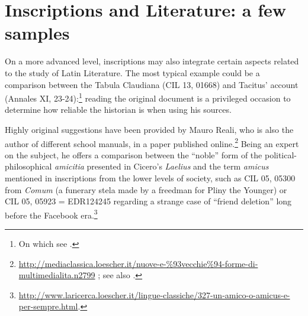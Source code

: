 \documentclass[amsthm,ebook]{saparticle}
\begin{document}
\section{Inscriptions and Literature: a few samples}
\noindent On a more advanced level, inscriptions may also integrate certain aspects related to the study of Latin Literature. The
most typical example could be a comparison between the Tabula Claudiana (CIL 13, 01668) and Tacitus’ account (Annales
XI, 23-24):\footnote{On which see \citet{Jahn1993}.} reading the original document is a privileged occasion to determine how
reliable the historian is when using his sources.

Highly original suggestions have been provided by Mauro Reali, who is also the author of different school manuals, in a
paper published online.\footnote{\url{http://mediaclassica.loescher.it/nuove-e-\%93vecchie\%94-forme-di-multimedialita.n2799}
; see also \citet{Reali2015}.} Being an expert on the subject, he offers a comparison between the ``noble'' form of
the political-philosophical \emph{amicitia} presented in Cicero’s \emph{Laelius} and the term \emph{amicus} mentioned in inscriptions
from the lower levels of society, such as CIL 05, 05300 from \emph{Comum} (a funerary stela made by a freedman for
Pliny the Younger) or CIL 05, 05923 = EDR124245 regarding a strange case of ``friend deletion'' long before the Facebook
era.\footnote{ \url{http://www.laricerca.loescher.it/lingue-classiche/327-un-amico-o-amicus-e-per-sempre.html}.}
\end{document}
